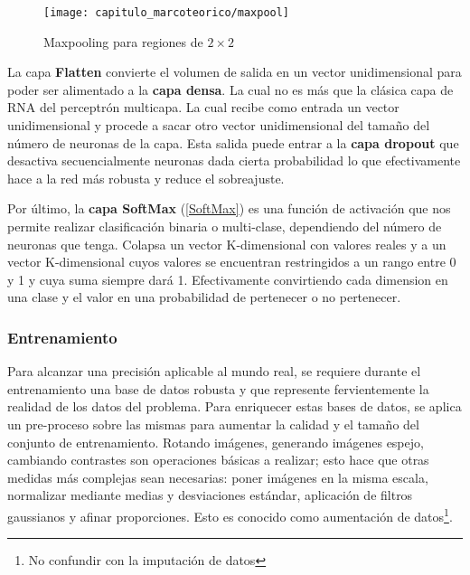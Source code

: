 
\begin{figure}[H]
    \centering
    \texttt{[image: capitulo\_marcoteorico/maxpool]}
    \caption{Maxpooling para regiones de \(2 \times 2\)}\label{fig:pool}
\end{figure}

La capa \textbf{Flatten} convierte el volumen de salida en un vector
unidimensional para poder ser alimentado a la \textbf{capa densa}. La cual no es
más que la clásica capa de RNA del perceptrón multicapa. La cual recibe como
entrada un vector unidimensional y procede a sacar otro vector unidimensional
del tamaño del número de neuronas de la capa. Esta salida puede entrar a la
\textbf{capa dropout} que desactiva secuencialmente neuronas dada cierta
probabilidad lo que efectivamente hace a la red más robusta y reduce el
sobreajuste.

Por último, la \textbf{capa SoftMax} (\autoref{SoftMax}) es una función de activación que nos
permite realizar clasificación binaria o multi-clase, dependiendo del número de
neuronas que tenga. Colapsa un vector K-dimensional con valores reales y a un
vector K-dimensional cuyos valores se encuentran restringidos a un rango entre 0
y 1 y cuya suma siempre dará 1. Efectivamente convirtiendo cada dimension en una
clase y el valor en una probabilidad de pertenecer o no pertenecer.


\subsubsection{Entrenamiento}

Para alcanzar una precisión aplicable al mundo real, se requiere durante el
entrenamiento una base de datos robusta y que represente fervientemente la
realidad de los datos del problema. Para enriquecer estas bases de datos, se
aplica un pre-proceso sobre las mismas para aumentar la calidad y el tamaño del
conjunto de entrenamiento. Rotando imágenes, generando imágenes espejo,
cambiando contrastes son operaciones básicas a realizar; esto hace que otras
medidas más complejas sean necesarias: poner imágenes en la misma escala,
normalizar mediante medias y desviaciones estándar, aplicación de filtros
gaussianos y afinar proporciones. Esto es conocido como aumentación de
datos\footnote{No confundir con la imputación de datos}.


